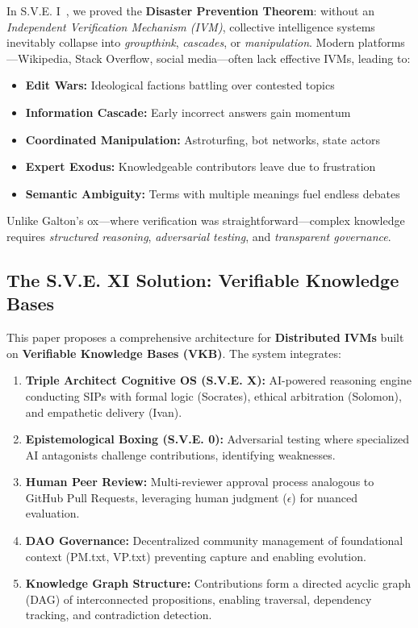 \documentclass[11pt,a4paper]{article}
\theoremstyle{definition}
\theoremstyle{remark}
\newcommand{\VKB}{\textsc{VKB}}
\newcommand{\IVM}{\textsc{IVM}}
\newcommand{\SIP}{\textsc{SIP}}
\newcommand{\DAO}{\textsc{DAO}}
\begin{document}
In S.V.E. I~\citep{sve1}, we proved the \textbf{Disaster Prevention Theorem}: without an \textit{Independent Verification Mechanism (\IVM{})}, collective intelligence systems inevitably collapse into \textit{groupthink}, \textit{cascades}, or \textit{manipulation}. Modern platforms—Wikipedia, Stack Overflow, social media—often lack effective \IVM{}s, leading to:

\begin{itemize}
    \item \textbf{Edit Wars:} Ideological factions battling over contested topics
    \item \textbf{Information Cascade:} Early incorrect answers gain momentum
    \item \textbf{Coordinated Manipulation:} Astroturfing, bot networks, state actors
    \item \textbf{Expert Exodus:} Knowledgeable contributors leave due to frustration
    \item \textbf{Semantic Ambiguity:} Terms with multiple meanings fuel endless debates
\end{itemize}

Unlike Galton's ox—where verification was straightforward—complex knowledge requires \textit{structured reasoning}, \textit{adversarial testing}, and \textit{transparent governance}.

\subsection{The S.V.E. XI Solution: Verifiable Knowledge Bases}

This paper proposes a comprehensive architecture for \textbf{Distributed \IVM{}s} built on \textbf{Verifiable Knowledge Bases (\VKB{})}. The system integrates:

\begin{enumerate}
    \item \textbf{Triple Architect Cognitive OS (S.V.E. X):} AI-powered reasoning engine conducting \SIP{}s with formal logic (Socrates), ethical arbitration (Solomon), and empathetic delivery (Ivan).
    
    \item \textbf{Epistemological Boxing (S.V.E. 0):} Adversarial testing where specialized AI antagonists challenge contributions, identifying weaknesses.
    
    \item \textbf{Human Peer Review:} Multi-reviewer approval process analogous to GitHub Pull Requests, leveraging human judgment ($\epsilon$) for nuanced evaluation.
    
    \item \textbf{\DAO{} Governance:} Decentralized community management of foundational context (PM.txt, VP.txt) preventing capture and enabling evolution.
    
    \item \textbf{Knowledge Graph Structure:} Contributions form a directed acyclic graph (DAG) of interconnected propositions, enabling traversal, dependency tracking, and contradiction detection.
\end{enumerate}
\end{document}
